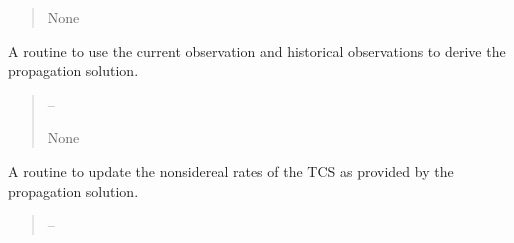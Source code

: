 \documentclass[letterpaper,11pt,english]{sphinxmanual}
\begin{document}
\begin{savenotes}
\begin{fulllineitems}
\begin{savenotes}
\begin{fulllineitems}
\begin{quote}
\begin{description}
\sphinxAtStartPar
None

\end{description}\end{quote}

\end{fulllineitems}\end{savenotes}


\begin{savenotes}\begin{fulllineitems}
\label{\detokenize{code/opihiexarata.gui.manual:opihiexarata.gui.manual.OpihiManualWindow.__connect_push_button_propagate_solve_propagation}}
\pysigstartsignatures
{}
\pysigstopsignatures
\sphinxAtStartPar
A routine to use the current observation and historical observations
to derive the propagation solution.
\begin{quote}\begin{description}
\sphinxAtStartPar
{} – 

\sphinxAtStartPar
None

\end{description}\end{quote}

\end{fulllineitems}\end{savenotes}


\begin{savenotes}\begin{fulllineitems}
\label{\detokenize{code/opihiexarata.gui.manual:opihiexarata.gui.manual.OpihiManualWindow.__connect_push_button_propagate_update_tcs_rate}}
\pysigstartsignatures
{}
\pysigstopsignatures
\sphinxAtStartPar
A routine to update the non\sphinxhyphen{}sidereal rates of the TCS as provided
by the propagation solution.
\begin{quote}\begin{description}
\sphinxAtStartPar
{} – 


\end{description}
\end{quote}
\end{fulllineitems}
\end{savenotes}
\end{fulllineitems}
\end{savenotes}
\end{document}
